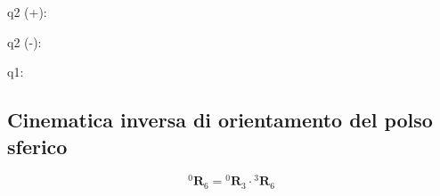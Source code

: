 \documentclass[11pt, a4paper]{article}
\begin{document}
\begin{matlaboutput}
q2 (+):
\end{matlaboutput}
\begin{matlabsymbolicoutput}
\end{matlabsymbolicoutput}
\begin{matlaboutput}
q2 (-):
\end{matlaboutput}
\begin{matlabsymbolicoutput}
\end{matlabsymbolicoutput}
\begin{matlaboutput}
q1:
\end{matlaboutput}
\begin{matlabsymbolicoutput}
\end{matlabsymbolicoutput}

\subsection*{Cinematica inversa di orientamento del polso sferico}

\[
    {}^{0}\mathbf{R}_6 = {}^{0}\mathbf{R}_3 \cdot {}^{3}\mathbf{R}_{6}
\]
\end{document}
